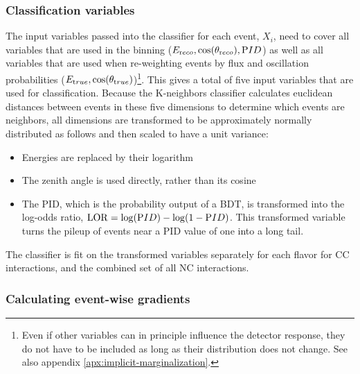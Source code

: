 \subsubsection{Classification variables}
The input variables passed into the classifier for each event, $X_i$, need to cover all variables that are used in the binning ($E_{\rm reco},\cos(\theta_{\rm reco}),{\rm PID}$) as well as all variables that are used when re-weighting events by flux and oscillation probabilities ($E_{\rm true},\cos(\theta_{\rm true})$)\footnote{Even if other variables can in principle influence the detector response, they do not have to be included as long as their distribution does not change. See also appendix \ref{apx:implicit-marginalization}.}. This gives a total of five input variables that are used for classification. Because the K-neighbors classifier calculates euclidean distances between events in these five dimensions to determine which events are neighbors, all dimensions are transformed to be approximately normally distributed as follows and then scaled to have a unit variance:
\begin{itemize}
    \item Energies are replaced by their logarithm
    \item The zenith angle is used directly, rather than its cosine
    \item The PID, which is the probability output of a BDT, is transformed into the log-odds ratio, $\mathrm{LOR}=\log({\rm PID}) - \log(1-{\rm PID})$. This transformed variable turns the pileup of events near a PID value of one into a long tail.
\end{itemize}
The classifier is fit on the transformed variables separately for each flavor for CC interactions, and the combined set of all NC interactions.

\subsubsection{Calculating event-wise gradients}

